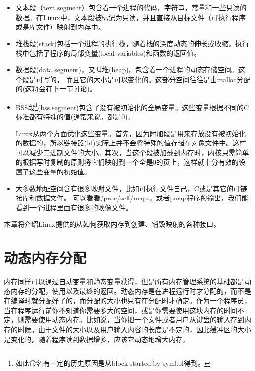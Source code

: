 \begin{itemize}
\item \begin{flushleft}文本段（text segment）包含着一个进程的代码，字符串，常量和一些只读的数据。在Linux中，文本段被标记为只读，并且直接从目标文件（可执行程序或是库文件）映射到内存中。\end{flushleft}
\item \begin{flushleft}堆栈段(stack)包括一个进程的执行栈，随着栈的深度动态的伸长或收缩。执行栈中包括了程序的局部变量(local variables)和函数的返回值。\end{flushleft}
\item \begin{flushleft}数据段(data segment)，又叫堆(heap)，包含着一个进程的动态存储空间。这个段是可写的， 而且它的大小是可以变化的。这部分空间往往是由malloc分配的(这将会在下一节讨论)。\end{flushleft}
\item \begin{flushleft}BSS段\footnote[1]{如此命名有一定的历史原因是从block started by symbol得到。}(bss segment)包含了没有被初始化的全局变量。这些变量根据不同的C标准都有特殊的值(通常来说，都是0)。

Linux从两个方面优化这些变量。首先，因为附加段是用来存放没有被初始化的数据的，所以链接器(ld)实际上并不会将特殊的值存储在对象文件中。这样可以减少二进制文件的大小。其次，当这个段被加载到内存时，内核只需简单的根据写时复制的原则将它们映射到一个全是0的页上，这样就十分有效的设置了这些变量的初始值。\end{flushleft}
\item \begin{flushleft}大多数地址空间含有很多映射文件，比如可执行文件自己，C或是其它的可链接库和数据文件。 可以看看/proc/self/maps，或者pmap程序的输出，我们能看到一个进程里面有很多的映像文件。\end{flushleft}
\end{itemize}

本章将介绍Linux提供的从如何获取内存到创建、销毁映射的各种接口。 

\section{动态内存分配}

内存同样可以通过自动变量和静态变量获得，但是所有内存管理系统的基础都是动态内存的分配，使用以及最终的返回。动态内存是在进程运行时才分配的，而不是在编译时就分配好了的，而分配的大小也只有在分配时才确定。作为一个程序员，当在程序运行前你不知道你需要多大的空间，或是你需要使用这块内存的时间不定，则需要使用动态内存。比如说，当你把一个文件或者用户从键盘的输入存到内存的时候。由于文件的大小以及用户输入内容的长度是不定的，因此缓冲区的大小是变化的，随着程序读到数据增多，应该它动态地增大内存。

